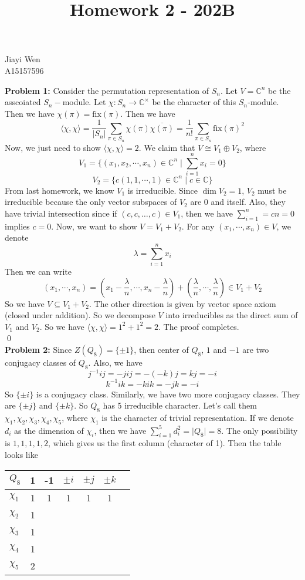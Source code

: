 \documentclass[12pt]{amsart}
\newcommand{\C}{\mathbb{C}}
\begin{document}
\title{Homework 2 - 202B}
\maketitle
\begin{center}
    Jiayi Wen\\
    A15157596
\end{center}
\textbf{Problem 1:} Consider the permutation representation of $S_n$. Let $V=\C^n$ be the asscoiated $S_n-$module. Let $\chi:S_n\to \C^\times $ be the character of this $S_n$-module. Then we have $\chi(\pi)=\mathrm{fix}(\pi)$. Then we have
\[\langle \chi,\chi\rangle=\frac{1}{|S_n|}\sum_{\pi\in S_n}\chi(\pi)\overline{\chi(\pi)}=\frac{1}{n!}\sum_{\pi\in S_n}\mathrm{fix}(\pi)^2\]
Now, we just need to show $\langle \chi,\chi\rangle=2$. We claim that $V\cong V_1\oplus V_2$, where
\[V_1=\{(x_1,x_2,\cdots,x_n)\in\C^n\mid \sum_{i=1}^nx_i=0\}\]
\[V_2=\{c(1,1,\cdots,1)\in\C^n\mid c\in \C\}\]
From last homework, we know $V_1$ is irreducible. Since $\dim V_2=1$, $V_2$ must be irreducible because the only vector subspaces of $V_2$ are $0$ and itself. Also, they have trivial intersection since if $(c,c,\dots, c)\in V_1$, then we have $\sum_{i=1}^n=cn=0$ implies $c=0$. Now, we want to show $V=V_1+V_2$. For any $(x_1,\cdots,x_n)\in V$, we denote
\[\lambda=\sum_{i=1}^n x_i\]
Then we can write
\[(x_1,\cdots, x_n)=(x_1-\frac{\lambda}{n},\cdots, x_n-\frac{\lambda}{n})+(\frac{\lambda}{n},\cdots,\frac{\lambda}{n})\in V_1+V_2\]
So we have $V\subseteq V_1+V_2$. The other direction is given by vector space axiom (closed under addition). So we decompose $V$ into irreducibles as the direct sum of $V_1$ and $V_2$.
So we have $\langle\chi,\chi\rangle=1^2+1^2=2$. The proof completes.
\\\qed\\
\textbf{Problem 2:} Since $Z(Q_8)=\{\pm1\}$, then center of $Q_8$, $1$ and $-1$ are two conjugacy classes of $Q_8$. Also, we have
\[j^{-1}ij=-jij=-(-k)j=kj=-i\]
\[k^{-1}ik=-kik=-jk=-i\]
So $\{\pm i\}$ is a conjugacy class. Similarly, we have two more conjugacy classes. They are $\{\pm j\}$ and $\{\pm k\}$. So $Q_8$ has 5 irreducible character. Let's call them $\chi_1,\chi_2,\chi_3,\chi_4,\chi_5$, where $\chi_1$ is the character of trivial representation. If we denote $d_i$ as the dimension of $\chi_i$, then we have $\sum_{i=1}^5 d_i^2=\mid Q_8\mid =8$. The only possibility is $1,1,1,1,2$, which gives us the first column (character of 1).  Then the table looks like
\begin{table}[H]
    \centering
    \begin{tabular}{l|cccccl}
        $Q_8$    & 1 & -1 & $\pm i$ & $\pm j$ & $\pm k$ \\ \hline
        $\chi_1$ & 1 & 1  & 1       & 1       & 1       \\
        $\chi_2$ & 1                                    \\
        $\chi_3$ & 1                                    \\
        $\chi_4$ & 1                                    \\
        $\chi_5$ & 2
    \end{tabular}
\end{table}
\end{document}

